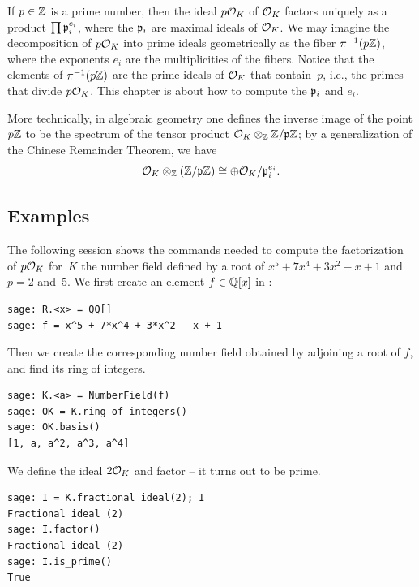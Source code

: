 If $p\in\mathbb{Z}$ is a prime number, then the ideal $p\mathcal{O}_K$ of $\mathcal{O}_K$
factors uniquely as a product $\prod \mathfrak{p}_i^{e_i}$, where the $\mathfrak{p}_i$ are
maximal ideals of $\mathcal{O}_K$.  We may imagine the decomposition of $p\mathcal{O}_K$
into prime ideals geometrically as the fiber $\pi^{-1}(p\mathbb{Z})$, where
the exponents $e_i$ are the multiplicities of the fibers.  Notice that
the elements of $\pi^{-1}(p\mathbb{Z})$ are the prime ideals of $\mathcal{O}_K$ that
contain~$p$, i.e., the primes that divide $p\mathcal{O}_K$.  
This chapter is about how to compute the $\mathfrak{p}_i$ and $e_i$.





\begin{remark}
  More technically, in algebraic geometry one defines the inverse
  image of the point $p\mathbb{Z}$ to be the spectrum of the tensor product
  $\mathcal{O}_K \otimes_{\mathbb{Z}} \mathbb{Z}/\mathfrak{p}\mathbb{Z}$; by a generalization of the Chinese
  Remainder Theorem, we have
$$
  \mathcal{O}_K \otimes_{\mathbb{Z}} \left(\mathbb{Z}/\mathfrak{p}\mathbb{Z}\right) \cong \oplus \mathcal{O}_K/\mathfrak{p}_i^{e_i}.
$$
\end{remark}



\subsection{Examples}
The following \sage session shows the commands needed to compute 
the factorization of $p\mathcal{O}_K$ for~$K$ the number field
defined by a root of $x^5+7x^4+3x^2-x+1$ and $p=2$ and~$5$.
We first create an element $f\in \mathbb{Q}[x]$ in \sage:
\begin{verbatim}
sage: R.<x> = QQ[]
sage: f = x^5 + 7*x^4 + 3*x^2 - x + 1
\end{verbatim}%

\par\noindent{}Then we create the corresponding number field obtained
by adjoining a root of $f$, and find its ring of integers.
\begin{verbatim}
sage: K.<a> = NumberField(f)
sage: OK = K.ring_of_integers()
sage: OK.basis()
[1, a, a^2, a^3, a^4]
\end{verbatim}%

\par\noindent{}We define the ideal $2\mathcal{O}_K$ and factor -- it turns
out to be prime. 
\begin{verbatim}
sage: I = K.fractional_ideal(2); I
Fractional ideal (2)
sage: I.factor()
Fractional ideal (2)
sage: I.is_prime()
True
\end{verbatim}%

